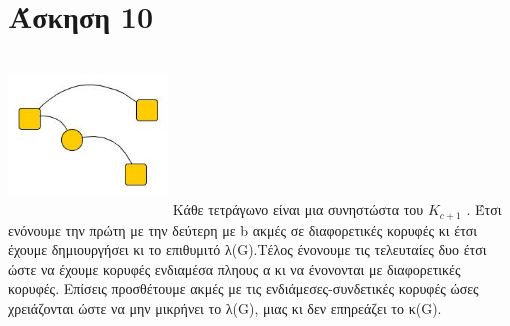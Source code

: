 \documentclass{article}
\begin{document}
     	 \section*{Άσκηση 10}
     	 	\includegraphics[width=120pt,height=120pt]{ex10}
	     	 	Κάθε τετράγωνο είναι μια συνηστώστα του $K_{c+1}$ . Έτσι ενόνουμε την πρώτη με την δεύτερη με b ακμές σε διαφορετικές κορυφές κι έτσι έχουμε δημιουργήσει κι το επιθυμιτό λ(G).Τέλος ένονουμε τις τελευταίες δυο έτσι ώστε να έχουμε κορυφές ενδιαμέσα πληους α κι να ένονονται με διαφορετικές κορυφές. Επίσεις προσθέτουμε ακμές με τις ενδιάμεσες-συνδετικές κορυφές ώσες χρειάζονται ώστε να μην μικρήνει το λ(G), μιας κι δεν επηρεάζει το κ(G).
	     	 	
 
\end{document}
